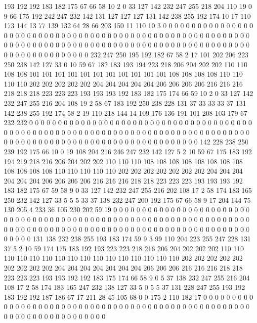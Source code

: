 193 192 192 183 182 175 67 66 58 10 2 0 33 127 142 232 247 255 218 204
110 19 0 9 66 175 192 242 247 232 142 131 127 127 127 131 142 238 255 192
174 10 17 110 173 144 13 77 139 132 64 28 66 203 150 11 110 10 3 0
0 0 0 0 0 0 0 0 0 0 0 0 0 0 0 0 0 0 0 0
0 0 0 0 0 0 0 0 0 0 0 0 0 0 0 0 0 0 0 0
0 0 0 0 0 0 0 0 0 0 0 0 0 0 0 0 0 0 0 0
0 0 0 0 0 0 0 0 0 0 0 0 0 0 0 0 0 0 0 0
0 0 0 0 0 0 0 0 0 0 0 0 0 0 0 0 0 0 0 0
0 0 0 0 0 0 0 0 0 0 0 0 0 0 0 0 232 247 250 195
192 182 67 58 2 17 101 202 206 223 250 238 142 127 33 0 10 59 67 182
183 193 194 223 218 206 204 202 202 110 110 108 108 101 101 101 101 101 101 101
101 101 101 101 108 108 108 108 110 110 110 110 202 202 202 202 202 204 204 204
204 204 206 206 206 206 216 216 216 218 218 218 223 223 223 193 193 193 192 183
182 175 174 66 59 10 2 0 33 127 142 232 247 255 216 204 108 19 2 58
67 183 192 250 238 228 131 37 33 33 33 37 131 142 238 255 192 174 58 2
19 110 218 144 14 109 176 136 191 101 208 103 179 67 232 232 0 0 0 0
0 0 0 0 0 0 0 0 0 0 0 0 0 0 0 0 0 0 0 0
0 0 0 0 0 0 0 0 0 0 0 0 0 0 0 0 0 0 0 0
0 0 0 0 0 0 0 0 0 0 0 0 0 0 0 0 0 0 0 0
0 0 0 0 0 0 0 0 0 0 0 0 0 0 0 0 0 0 0 0
0 0 0 0 0 0 0 0 0 0 0 0 0 0 0 0 0 0 0 0
0 0 0 0 0 0 0 0 0 0 0 0 142 228 238 250 239 192 175 66
10 0 19 108 204 216 246 247 232 142 127 5 2 10 59 67 175 183 192 194
219 218 216 206 204 202 202 110 110 110 108 108 108 108 108 108 108 108 108 108
108 108 110 110 110 110 110 202 202 202 202 202 202 202 204 204 204 204 204 204
206 206 206 206 216 216 216 218 218 223 223 223 193 193 193 192 183 182 175 67
59 58 9 0 33 127 142 232 247 255 216 202 108 17 2 58 174 183 165 250
232 142 127 33 5 5 5 33 37 138 232 247 200 192 175 67 66 58 9 17
204 144 75 130 205 4 233 36 105 230 202 59 19 0 0 0 0 0 0 0
0 0 0 0 0 0 0 0 0 0 0 0 0 0 0 0 0 0 0 0
0 0 0 0 0 0 0 0 0 0 0 0 0 0 0 0 0 0 0 0
0 0 0 0 0 0 0 0 0 0 0 0 0 0 0 0 0 0 0 0
0 0 0 0 0 0 0 0 0 0 0 0 0 0 0 0 0 0 0 0
0 0 0 0 0 0 0 0 0 0 0 0 0 0 0 0 0 0 0 0
0 0 0 0 0 0 0 0 131 138 232 238 255 193 183 174 59 9 3 99
110 204 223 255 247 228 131 37 5 2 10 59 174 175 183 192 193 223 223 218
216 206 204 202 202 202 110 110 110 110 110 110 110 110 110 110 110 110 110 110
110 110 202 202 202 202 202 202 202 202 202 204 204 204 204 204 204 204 206 206
206 216 216 216 218 218 223 223 223 193 193 192 192 183 175 174 66 58 9 0
5 37 138 232 247 255 216 204 108 17 2 58 174 183 165 247 232 138 127 33
5 0 5 5 37 131 228 247 255 193 192 183 192 192 187 186 67 17 211 28
45 105 68 0 0 175 2 110 182 17 0 0 0 0 0 0 0 0 0 0
0 0 0 0 0 0 0 0 0 0 0 0 0 0 0 0 0 0 0 0
0 0 0 0 0 0 0 0 0 0 0 0 0 0 0 0 0 0 0 0
0 0 0 0 0 0 0 0 0 0 0 0 0 0 0 0 0 0 0 0
